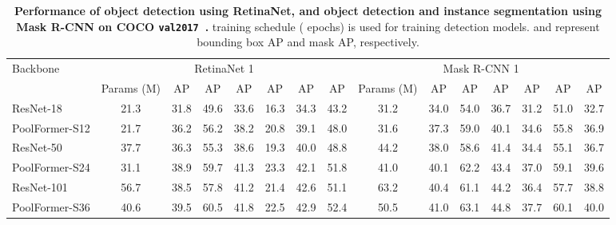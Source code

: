 \begin{table*}[t]
\small
\centering
\setlength{\tabcolsep}{2pt}
\begin{tabular}{l|c|ccc|ccc|c|ccc|ccc}
\toprule
\multirow{2}{*}{Backbone} & \multicolumn{7}{c|}{RetinaNet 1} & \multicolumn{7}{c}{Mask R-CNN 1} \\
\cline{2-15}
& Params (M) & AP & AP &AP & AP & AP & AP & Params (M) & AP &AP &AP  &AP &AP &AP \\
\whline
\resnetdot{} ResNet-18~\cite{resnet}  & 21.3 & 31.8 & 49.6 & 33.6 & 16.3 & 34.3 & 43.2 & 31.2 &  34.0 & 54.0 & 36.7 & 31.2 & 51.0 & 32.7 \\
\poolformer{} PoolFormer-S12          & 21.7 & 36.2 & 56.2 & 38.2 & 20.8 & 39.1 & 48.0 & 31.6 &  37.3 & 59.0 & 40.1 & 34.6 & 55.8 & 36.9 \\
\hline
\resnetdot{} ResNet-50~\cite{resnet}  & 37.7 & 36.3 & 55.3 & 38.6 & 19.3 & 40.0 & 48.8 & 44.2 &  38.0 & 58.6 & 41.4 & 34.4 & 55.1 & 36.7 \\
\poolformer{} PoolFormer-S24          & 31.1 & 38.9 & 59.7 & 41.3 & 23.3 & 42.1 & 51.8 & 41.0 &  40.1 & 62.2 & 43.4 & 37.0 & 59.1 & 39.6 \\
\hline
\resnetdot{} ResNet-101~\cite{resnet}  & 56.7 & 38.5 & 57.8 & 41.2 & 21.4 & 42.6 & 51.1 & 63.2 &  40.4 & 61.1 & 44.2 & 36.4 & 57.7 & 38.8 \\
\poolformer{} PoolFormer-S36           & 40.6 & 39.5 & 60.5 & 41.8 & 22.5 & 42.9 & 52.4 & 50.5 &  41.0 & 63.1 & 44.8 & 37.7 & 60.1 & 40.0 \\ 
\bottomrule
\end{tabular} \vspace{-3mm}
\caption{\textbf{Performance of object detection using RetinaNet, and object detection and instance segmentation using Mask R-CNN on COCO \texttt{val2017}~\cite{coco}.}  training schedule ( epochs) is used for training detection models.  and  represent bounding box AP and mask AP, respectively.}
\label{tab:coco_det} 
\vspace{-3mm}
\end{table*}


\begin{comment}
\begin{table*}[t]
\centering
\setlength{\tabcolsep}{10pt}

\vspace{-2mm}
\caption{\textbf{Performance of object detection and instance segmentation on COCO \texttt{val2017} \cite{coco}}.  and  represent bounding box AP and mask AP, respectively. All models are based on Mask R-CNN and trained by  training schedule (\ie 12 epochs).}
\label{tab:coco_det_seg} 
\end{table*}
\end{comment}


